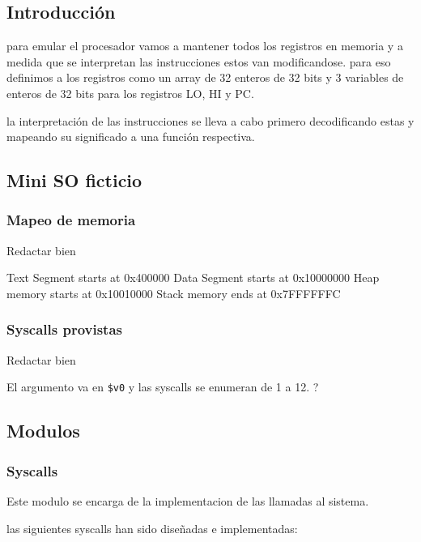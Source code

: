 \documentclass[12pt]{article}
\begin{document}
\subsection{Introducción}
para emular el procesador vamos a mantener todos los registros en memoria y a
medida que se interpretan las instrucciones estos van modificandose.
para eso definimos a los registros como un array de 32 enteros de 32 bits
y 3 variables de enteros de 32 bits para  los registros LO, HI y PC.

la interpretación de las instrucciones se lleva a cabo primero decodificando
estas y mapeando su significado a una función respectiva.
\subsection{Mini SO ficticio}
\subsubsection{Mapeo de memoria}
Redactar bien

Text Segment starts at 0x400000
Data Segment starts at 0x10000000
Heap memory starts at 0x10010000
Stack memory ends at 0x7FFFFFFC
\subsubsection{Syscalls provistas}
Redactar bien

El argumento va en \texttt{\$v0} y las syscalls se enumeran de 1 a 12. ?

\subsection{Modulos}
\subsubsection{Syscalls}
Este modulo se encarga de la implementacion de las llamadas al sistema.

las siguientes syscalls han sido diseñadas e implementadas:
\end{document}
